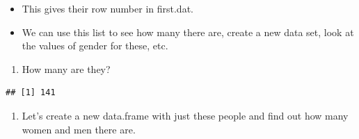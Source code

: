 \documentclass[
]{gitbook}
\newenvironment{Shaded}{\begin{snugshade}}{\end{snugshade}}
\newcommand{\DecValTok}[1]{\textcolor[rgb]{0.00,0.00,0.81}{#1}}
\newcommand{\FunctionTok}[1]{\textcolor[rgb]{0.00,0.00,0.00}{#1}}
\newcommand{\NormalTok}[1]{#1}
\newcommand{\OtherTok}[1]{\textcolor[rgb]{0.56,0.35,0.01}{#1}}
\newcommand{\SpecialCharTok}[1]{\textcolor[rgb]{0.00,0.00,0.00}{#1}}
\providecommand{\tightlist}{%
  \setlength{\itemsep}{0pt}\setlength{\parskip}{0pt}}
\begin{document}
\begin{Shaded}
\end{Shaded}

\begin{itemize}
\tightlist
\item
  This gives their row number in first.dat.
\item
  We can use this list to see how many there are, create a new data set, look at the values of gender for these, etc.
\end{itemize}

\begin{enumerate}
\def\labelenumi{\arabic{enumi}.}
\setcounter{enumi}{4}
\tightlist
\item
  How many are they?
\end{enumerate}

\begin{Shaded}
\end{Shaded}

\begin{verbatim}
## [1] 141
\end{verbatim}

\begin{enumerate}
\def\labelenumi{\arabic{enumi}.}
\setcounter{enumi}{5}
\tightlist
\item
  Let's create a new data.frame with just these people and find out how many women and men there are.
\end{enumerate}

\begin{Shaded}
\end{Shaded}
\end{document}
